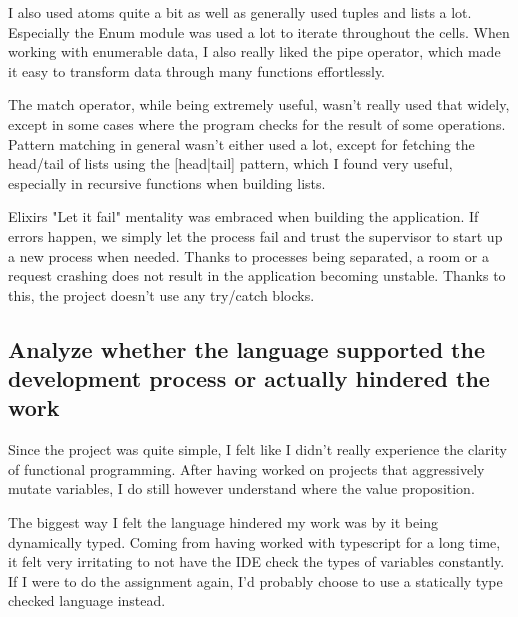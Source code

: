 I also used atoms quite a bit as well as generally used tuples and lists a lot. Especially the Enum module was used a lot to iterate throughout the cells. When working with enumerable data, I also really liked the pipe operator, which made it easy to transform data through many functions effortlessly.

The match operator, while being extremely useful, wasn't really used that widely, except in some cases where the program checks for the result of some operations. Pattern matching in general wasn't either used a lot, except for fetching the head/tail of lists using the [head|tail] pattern, which I found very useful, especially in recursive functions when building lists.

Elixirs "Let it fail" mentality was embraced when building the application. If errors happen, we simply let the process fail and trust the supervisor to start up a new process when needed. Thanks to processes being separated, a room or a request crashing does not result in the application becoming unstable. Thanks to this, the project doesn't use any try/catch blocks.

\subsection{Analyze whether the language supported the development process or actually hindered the work}
Since the project was quite simple, I felt like I didn't really experience the clarity of functional programming. After having worked on projects that aggressively mutate variables, I do still however understand where the value proposition.

The biggest way I felt the language hindered my work was by it being dynamically typed. Coming from having worked with typescript for a long time, it felt very irritating to not have the IDE check the types of variables constantly. If I were to do the assignment again, I'd probably choose to use a statically type checked language instead.